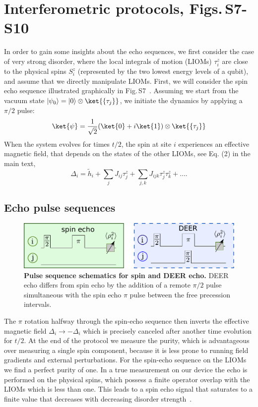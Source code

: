 \section{Interferometric protocols, Figs.\,S7-S10}
In order to gain some insights about the echo sequences, we first consider the case of very strong disorder, where the local integrals of motion (LIOMs) $\tau_i^z$ are close to the physical spins $S_i^z$ (represented by the two lowest energy levels of a qubit), and assume that we directly manipulate LIOMs. First, we will consider the spin echo sequence illustrated graphically in Fig.\,S7~\cite{KnapPRL2014}.  Assuming we start from the vacuum state $\left|\psi_0\right> = \left| 0 \right>\otimes \ket{\{\tau_j\}} $, we initiate the dynamics by applying a $\pi/2$ pulse:
\begin{equation}
\ket{\psi} =\frac{1}{\sqrt{2}} (\ket{0} + i \ket{1}) \otimes \ket{\{\tau_j\}}
\end{equation}
When the system evolves for times $t/2$, the spin at site $i$ experiences an effective magnetic field, that depends on the states of the other LIOMs, see Eq. (2) in the main text,
\begin{equation}
\label{field}
\Delta_i = \tilde{h}_i  + \sum_j J_{ij} \tau_j^z + \sum_{j,k} J_{ijk}  \tau_j^z \tau_k^z + \ldots.
\end{equation}
\subsection{Echo pulse sequences}
\begin{figure}[h]
\centering
\includegraphics[width=.6\columnwidth]{./PDF/schem2}
\caption{\textbf{Pulse sequence schematics for spin and DEER echo.}  DEER echo differs from spin echo by the addition of a remote $\pi / 2$ pulse simultaneous with the spin echo $\pi$ pulse between the free precession intervals.}
\label{fig:4}
\end{figure}
The $\pi$ rotation halfway through the spin-echo sequence then inverts the effective magnetic field $\Delta_i \to -\Delta_i$ which is precisely canceled after another time evolution for $t/2$. At the end of the protocol we measure the purity, which is advantageous over measuring a single spin component, because it is less prone to running field gradients and external perturbations. For the spin-echo sequence on the LIOMs we find a perfect purity of one.
In a true measurement on our device the echo is performed on the physical spins, which possess a finite operator overlap with the LIOMs which is less than one. This leads to a spin echo signal that saturates to a finite value that decreases with decreasing disorder strength~\cite{KnapPRL2014}.

